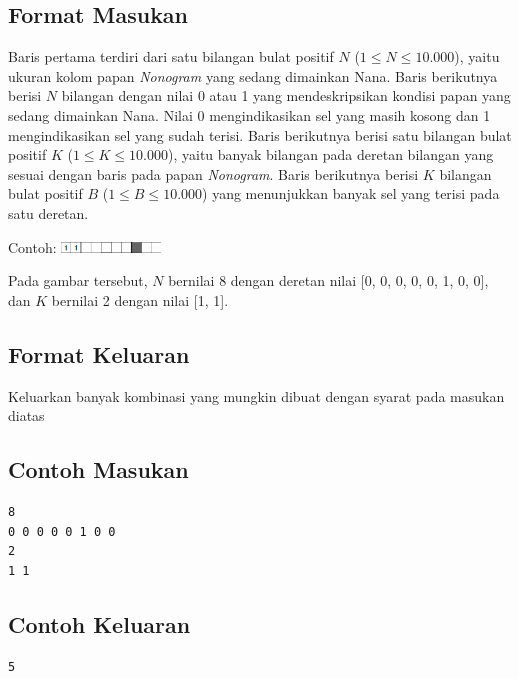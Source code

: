 \documentclass{article}
\begin{document}
\subsection*{Format Masukan}

Baris pertama terdiri dari satu bilangan bulat positif $N$ ($1 \leq N \leq 10.000$), yaitu ukuran kolom papan \textit{Nonogram} yang sedang dimainkan Nana.
Baris berikutnya berisi $N$ bilangan dengan nilai 0 atau 1 yang mendeskripsikan kondisi papan  yang sedang dimainkan Nana. 
Nilai 0 mengindikasikan sel yang masih kosong dan 1 mengindikasikan sel yang sudah terisi.
Baris berikutnya berisi satu bilangan bulat positif $K$ ($1 \leq K \leq 10.000$), yaitu banyak bilangan pada deretan bilangan yang sesuai dengan baris pada papan \textit{Nonogram}.
Baris berikutnya berisi $K$ bilangan bulat positif $B$ ($1 \leq B \leq 10.000$) yang menunjukkan banyak sel yang terisi pada satu deretan.

Contoh:
\includegraphics[width=100px]{Homogram-Row}

Pada gambar tersebut, $N$ bernilai 8 dengan deretan nilai [0, 0, 0, 0, 0, 1, 0, 0], dan $K$ bernilai 2 dengan nilai [1, 1].

\subsection*{Format Keluaran}

Keluarkan banyak kombinasi yang mungkin dibuat dengan syarat pada masukan diatas
\\

\begin{multicols}{2}
\subsection*{Contoh Masukan}
\begin{lstlisting}
8
0 0 0 0 0 1 0 0
2
1 1
\end{lstlisting}
\columnbreak
\subsection*{Contoh Keluaran}
\begin{lstlisting}
5
\end{lstlisting}
\vfill
\null
\end{multicols}

\pagebreak
\end{document}
